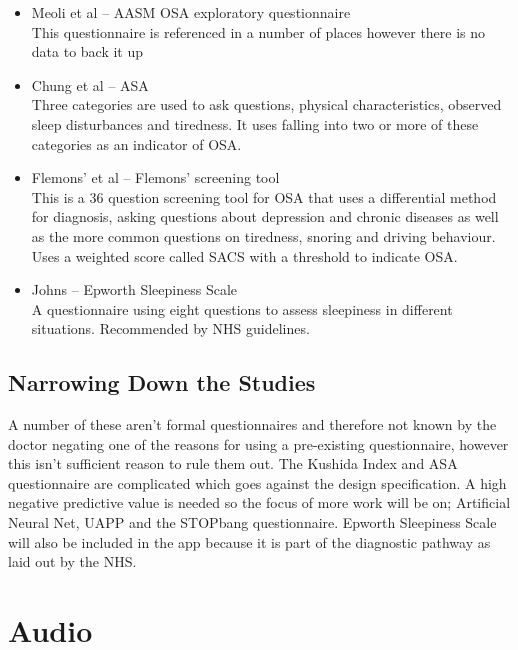 \begin{itemize}
\item Meoli et al – AASM OSA exploratory questionnaire\\
This questionnaire is referenced in a number of places however there is no data to back it up
\item Chung et al – ASA\\
Three categories are used to ask questions, physical characteristics, observed sleep disturbances and tiredness. It uses falling into two or more of these categories as an indicator of OSA. 
\item Flemons’ et al – Flemons’ screening tool\\
This is a 36 question screening tool for OSA that uses a differential method for diagnosis, asking questions about depression and chronic diseases as well as the more common questions on tiredness, snoring and driving behaviour. Uses a weighted score called SACS with a threshold to indicate OSA. 
\item Johns – Epworth Sleepiness Scale\\
A questionnaire using eight questions to assess sleepiness in different situations. Recommended by NHS guidelines. 
\end{itemize}

\subsection{Narrowing Down the Studies}
A number of these aren’t formal questionnaires and therefore not known by the doctor negating one of the reasons for using a pre-existing questionnaire, however this isn’t sufficient reason to rule them out. The Kushida Index and ASA questionnaire are complicated which goes against the design specification. A high negative predictive value is needed so the focus of more work will be on; Artificial Neural Net, UAPP and the STOPbang questionnaire. Epworth Sleepiness Scale will also be included in the app because it is part of the diagnostic pathway as laid out by the NHS.

\section{Audio}

